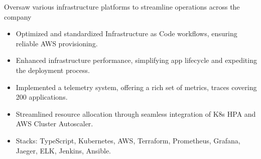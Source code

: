 \documentclass{resume}
\begin{document}
Oversaw various infrastructure platforms to streamline operations across the company
\begin{itemize}
  \item Optimized and standardized Infrastructure as Code workflows, ensuring reliable AWS provisioning.
  \item Enhanced infrastructure performance, simplifying app lifecycle and expediting the deployment process.
  \item Implemented a telemetry system, offering a rich set of metrics, traces covering 200 applications.
  \item Streamlined resource allocation through seamless integration of K8s HPA and AWS Cluster Autoscaler.
  \item Stacks: TypeScript, Kubernetes, AWS, Terraform, Prometheus, Grafana, Jaeger, ELK, Jenkins, Ansible.
\end{itemize}

\end{document}

